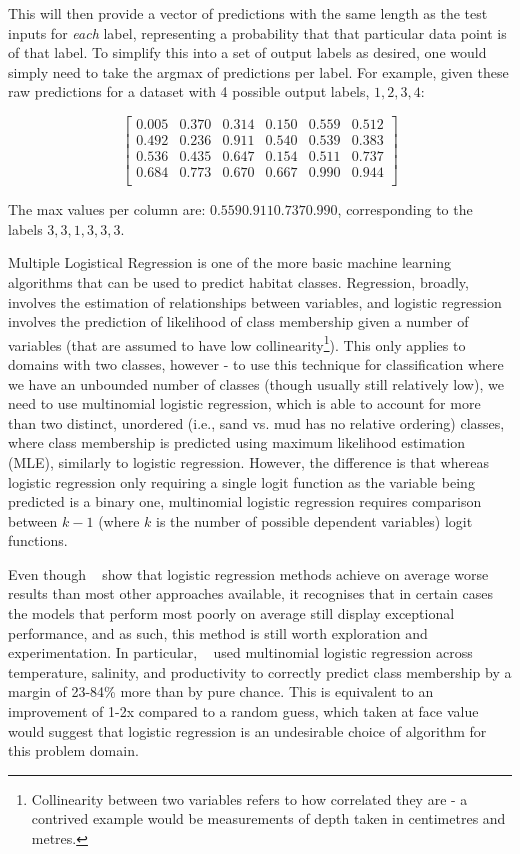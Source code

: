 This will then provide a vector of predictions with the same length as the test inputs for \textit{each} label, representing a probability that that particular data point is of that label. To simplify this into a set of output labels as desired, one would simply need to take the argmax of predictions per label. For example, given these raw predictions for a dataset with 4 possible output labels, $1, 2, 3, 4$:

\[
\begin{bmatrix}
    0.005 &  0.370 &  0.314 &  0.150 &  0.559 &  0.512\\
    0.492 &  0.236 &  0.911 &  0.540 &  0.539 &  0.383\\
    0.536 &  0.435 &  0.647 &  0.154 &  0.511 &  0.737\\
    0.684 &  0.773 &  0.670 &  0.667 &  0.990 &  0.944\\
\end{bmatrix}
\]

The max values per column are: $0.559 0.911 0.737 0.990$, corresponding to the labels $3, 3, 1, 3, 3, 3$.

Multiple Logistical Regression is one of the more basic machine learning algorithms that can be used to predict habitat classes. Regression, broadly, involves the estimation of relationships between variables, and logistic regression involves the prediction of likelihood of class membership given a number of variables (that are assumed to have low collinearity\footnote{Collinearity between two variables refers to how correlated they are - a contrived example would be measurements of depth taken in centimetres and metres.}). This only applies to domains with two classes, however - to use this technique for classification where we have an unbounded  number of classes (though usually still relatively low), we need to use multinomial logistic regression, which is able to account for more than two distinct, unordered (i.e., sand vs. mud has no relative ordering) classes, where class membership is predicted using maximum likelihood estimation (MLE), similarly to logistic regression. However, the difference is that whereas logistic regression only requiring a single logit function as the variable being predicted is a binary one, multinomial logistic regression requires comparison between $k-1$ (where $k$ is the number of possible dependent variables) logit functions. 

Even though ~\citet{caruana06} show that logistic regression methods achieve on average worse results than most other approaches available, it recognises that in certain cases the models that perform most poorly on average still display exceptional performance, and as such, this method is still worth exploration and experimentation. In particular, ~\citet{belanger12} used multinomial logistic regression across temperature, salinity, and productivity to correctly predict class membership by a margin of 23-84\% more than by pure chance. This is equivalent to an improvement of 1-2x compared to a random guess, which taken at face value would suggest that logistic regression is an undesirable choice of algorithm for this problem domain.

